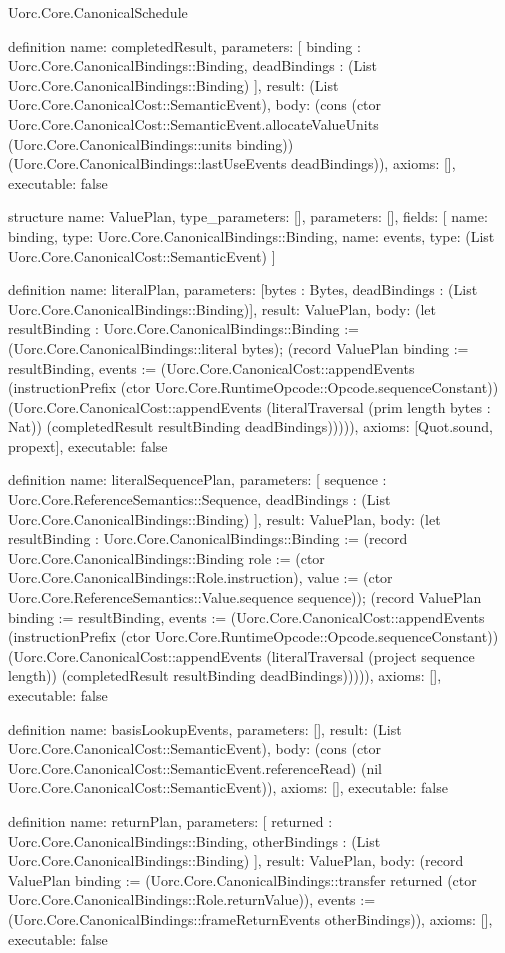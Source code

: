 \begin{lexlean}{Uorc.Core.CanonicalSchedule}
\begin{semanticmodule}
definition{
  name: completedResult,
  parameters: [
    binding : Uorc.Core.CanonicalBindings::Binding,
    deadBindings : (List Uorc.Core.CanonicalBindings::Binding)
  ],
  result: (List Uorc.Core.CanonicalCost::SemanticEvent),
  body: (cons (ctor Uorc.Core.CanonicalCost::SemanticEvent.allocateValueUnits (Uorc.Core.CanonicalBindings::units binding)) (Uorc.Core.CanonicalBindings::lastUseEvents deadBindings)),
  axioms: [],
  executable: false
}

structure{
  name: ValuePlan,
  type_parameters: [],
  parameters: [],
  fields: [
    {name: binding, type: Uorc.Core.CanonicalBindings::Binding},
    {name: events, type: (List Uorc.Core.CanonicalCost::SemanticEvent)}
  ]
}

definition{
  name: literalPlan,
  parameters: [bytes : Bytes, deadBindings : (List Uorc.Core.CanonicalBindings::Binding)],
  result: ValuePlan,
  body: (let resultBinding : Uorc.Core.CanonicalBindings::Binding := (Uorc.Core.CanonicalBindings::literal bytes); (record ValuePlan {binding := resultBinding, events := (Uorc.Core.CanonicalCost::appendEvents (instructionPrefix (ctor Uorc.Core.RuntimeOpcode::Opcode.sequenceConstant)) (Uorc.Core.CanonicalCost::appendEvents (literalTraversal (prim length bytes : Nat)) (completedResult resultBinding deadBindings)))})),
  axioms: [Quot.sound, propext],
  executable: false
}

definition{
  name: literalSequencePlan,
  parameters: [
    sequence : Uorc.Core.ReferenceSemantics::Sequence,
    deadBindings : (List Uorc.Core.CanonicalBindings::Binding)
  ],
  result: ValuePlan,
  body: (let resultBinding : Uorc.Core.CanonicalBindings::Binding := (record Uorc.Core.CanonicalBindings::Binding {role := (ctor Uorc.Core.CanonicalBindings::Role.instruction), value := (ctor Uorc.Core.ReferenceSemantics::Value.sequence sequence)}); (record ValuePlan {binding := resultBinding, events := (Uorc.Core.CanonicalCost::appendEvents (instructionPrefix (ctor Uorc.Core.RuntimeOpcode::Opcode.sequenceConstant)) (Uorc.Core.CanonicalCost::appendEvents (literalTraversal (project sequence length)) (completedResult resultBinding deadBindings)))})),
  axioms: [],
  executable: false
}

definition{
  name: basisLookupEvents,
  parameters: [],
  result: (List Uorc.Core.CanonicalCost::SemanticEvent),
  body: (cons (ctor Uorc.Core.CanonicalCost::SemanticEvent.referenceRead) (nil Uorc.Core.CanonicalCost::SemanticEvent)),
  axioms: [],
  executable: false
}

definition{
  name: returnPlan,
  parameters: [
    returned : Uorc.Core.CanonicalBindings::Binding,
    otherBindings : (List Uorc.Core.CanonicalBindings::Binding)
  ],
  result: ValuePlan,
  body: (record ValuePlan {binding := (Uorc.Core.CanonicalBindings::transfer returned (ctor Uorc.Core.CanonicalBindings::Role.returnValue)), events := (Uorc.Core.CanonicalBindings::frameReturnEvents otherBindings)}),
  axioms: [],
  executable: false
}


\end{semanticmodule}
\end{lexlean}

